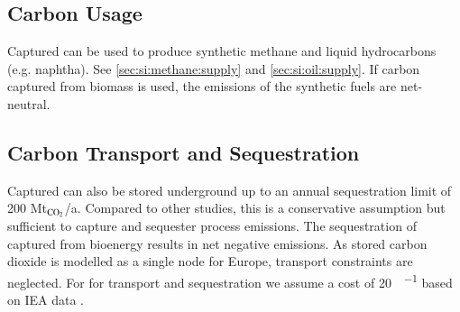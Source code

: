 \subsection{Carbon Usage}

Captured \co can be used to produce synthetic methane and liquid hydrocarbons
(e.g. naphtha). See \cref{sec:si:methane:supply} and \cref{sec:si:oil:supply}.
If carbon captured from biomass is used, the \co emissions of the synthetic
fuels are net-neutral.

\subsection{Carbon Transport and Sequestration}

Captured \co can also be stored underground up to an annual sequestration limit
of 200 Mt$_{\ce{CO2}}$/a. Compared to other studies, this is a conservative assumption but
sufficient to capture and sequester process emissions. The sequestration of
captured \co from bioenergy results in net negative emissions. As stored carbon
dioxide is modelled as a single node for Europe, transport constraints are
neglected. For for \co transport and sequestration we assume a cost of
\SI{20}{\sieuro\per\tco} based on IEA data .

